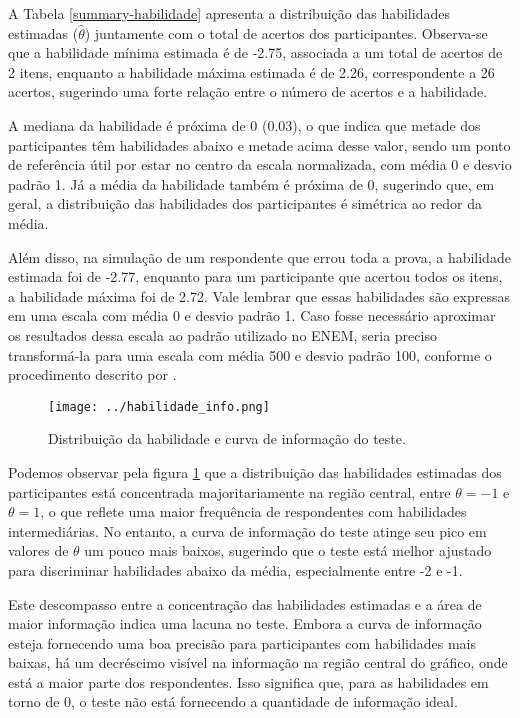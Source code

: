 A Tabela \ref{summary-habilidade} apresenta a distribuição das habilidades estimadas ($\hat{\theta}$) juntamente com o total de acertos dos participantes. Observa-se que a habilidade mínima estimada é de -2.75, associada a um total de acertos de 2 itens, enquanto a habilidade máxima estimada é de 2.26, correspondente a 26 acertos, sugerindo uma forte relação entre o número de acertos e a habilidade.

A mediana da habilidade é próxima de 0 (0.03), o que indica que metade dos participantes têm habilidades abaixo e metade acima desse valor, sendo um ponto de referência útil por estar no centro da escala normalizada, com média 0 e desvio padrão 1. Já a média da habilidade também é próxima de 0, sugerindo que, em geral, a distribuição das habilidades dos participantes é simétrica ao redor da média.


Além disso, na simulação de um respondente que errou toda a prova, a habilidade estimada foi de -2.77, enquanto para um participante que acertou todos os itens, a habilidade máxima foi de 2.72. Vale lembrar que essas habilidades são expressas em uma escala com média 0 e desvio padrão 1. Caso fosse necessário aproximar os resultados dessa escala ao padrão utilizado no ENEM, seria preciso transformá-la para uma escala com média 500 e desvio padrão 100, conforme o procedimento descrito por .

\begin{figure}[H]
	\centering
	\texttt{[image: ../habilidade\_info.png]}
	\caption{Distribuição da habilidade e curva de informação do teste.}
	\label{fig:info_habilidade}
\end{figure}

Podemos observar pela figura \ref{fig:info_habilidade} que a distribuição das habilidades estimadas dos participantes está concentrada majoritariamente na região central, entre $\theta = -1$ e $\theta = 1$, o que reflete uma maior frequência de respondentes com habilidades intermediárias. No entanto, a curva de informação do teste atinge seu pico em valores de $\theta$ um pouco mais baixos, sugerindo que o teste está melhor ajustado para discriminar habilidades abaixo da média, especialmente entre -2 e -1.

Este descompasso entre a concentração das habilidades estimadas e a área de maior informação indica uma lacuna no teste. Embora a curva de informação esteja fornecendo uma boa precisão para participantes com habilidades mais baixas, há um decréscimo visível na informação na região central do gráfico, onde está a maior parte dos respondentes. Isso significa que, para as habilidades em torno de 0, o teste não está fornecendo a quantidade de informação ideal.

